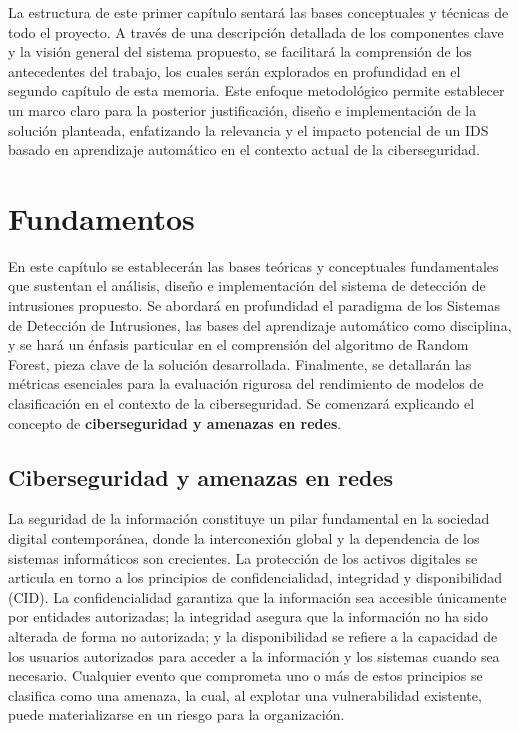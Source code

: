La estructura de este primer capítulo sentará las bases conceptuales y técnicas de todo el proyecto. A través de una descripción detallada de los componentes clave y la visión general del sistema propuesto, se facilitará la comprensión de los antecedentes del trabajo, los cuales serán explorados en profundidad en el segundo capítulo de esta memoria. Este enfoque metodológico permite establecer un marco claro para la posterior justificación, diseño e implementación de la solución planteada, enfatizando la relevancia y el impacto potencial de un IDS basado en aprendizaje automático en el contexto actual de la ciberseguridad.

\section{Fundamentos}

En este capítulo se establecerán las bases teóricas y conceptuales fundamentales que sustentan el análisis, diseño e implementación del sistema de detección de intrusiones propuesto. Se abordará en profundidad el paradigma de los Sistemas de Detección de Intrusiones, las bases del aprendizaje automático como disciplina, y se hará un énfasis particular en el comprensión del algoritmo de Random Forest, pieza clave de la solución desarrollada. Finalmente, se detallarán las métricas esenciales para la evaluación rigurosa del rendimiento de modelos de clasificación en el contexto de la ciberseguridad. Se comenzará explicando el concepto de \textbf{ciberseguridad y amenazas en redes}.


\subsection{Ciberseguridad y amenazas en redes}

La seguridad de la información constituye un pilar fundamental en la sociedad digital contemporánea, donde la interconexión global y la dependencia de los sistemas informáticos son crecientes. La protección de los activos digitales se articula en torno a los principios de confidencialidad, integridad y disponibilidad (CID). La confidencialidad garantiza que la información sea accesible únicamente por entidades autorizadas; la integridad asegura que la información no ha sido alterada de forma no autorizada; y la disponibilidad se refiere a la capacidad de los usuarios autorizados para acceder a la información y los sistemas cuando sea necesario. Cualquier evento que comprometa uno o más de estos principios se clasifica como una amenaza, la cual, al explotar una vulnerabilidad existente, puede materializarse en un riesgo para la organización.

